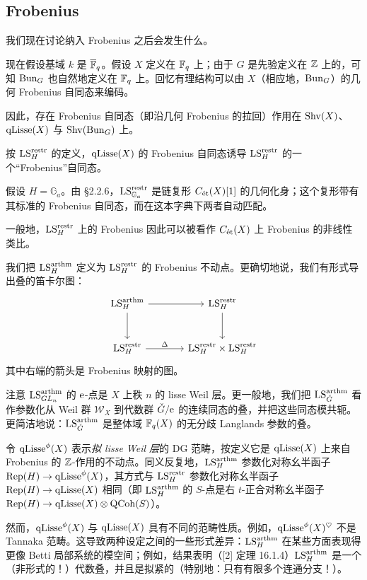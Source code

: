 \subsection{Frobenius}

\pnum{}我们现在讨论纳入 Frobenius 之后会发生什么。

现在假设基域 $k$ 是 $\Fb$。假设 $X$ 定义在 $\F_q$ 上；由于 $G$ 是先验定义在 $\ZZ$ 上的，可知 $\Bun_G$ 也自然地定义在 $\F_q$ 上。回忆有理结构可以由 $X$（相应地，$\Bun_G$）的几何 Frobenius 自同态来编码。

因此，存在 Frobenius 自同态（即沿几何 Frobenius 的拉回）作用在 $\Shv(X)$、$\qLisse(X)$ 与 $\Shv(\Bun_G)$ 上。

按 $\LS^{\restr}_{H}$ 的定义，$\qLisse(X)$ 的 Frobenius 自同态诱导 $\LS^{\restr}_{H}$ 的一个“Frobenius”自同态。

\begin{example}
假设 $H = \mathbb{G}_a$。由 §2.2.6，$\LS^{\restr}_{\mathbb{G}_a}$ 是链复形 $C_{\et}(X)[1]$ 的几何化身；这个复形带有其标准的 Frobenius 自同态，而在这本字典下两者自动匹配。

一般地，$\LS^{\restr}_{H}$ 上的 Frobenius 因此可以被看作 $C_{\et}(X)$ 上 Frobenius 的非线性类比。
\end{example}

\pnum{}我们把 $\LS^{\arthm}_{H}$ 定义为 $\LS^{\restr}_{H}$ 的 Frobenius 不动点。更确切地说，我们有形式导出叠的笛卡尔图：
\begin{equation*}
\begin{tikzcd}[row sep=large, column sep=large]
  \LS^{\arthm}_H \arrow[r] \arrow[d] & \LS^{\restr}_H \arrow[d] \\
  \LS^{\restr}_H \arrow[r, "\Delta"] & \LS^{\restr}_H \times \LS^{\restr}_H
\end{tikzcd}
\end{equation*}
其中右端的箭头是 Frobenius 映射的图。

注意 $\LS^{\arthm}_{GL_n}$ 的 $\e$-点是 $X$ 上秩 $n$ 的 lisse Weil 层。更一般地，我们把 $\LS^{\arthm}_{\bG}$ 看作参数化从 Weil 群 $\mathcal{W}_X$ 到代数群 $\bG/\e$ 的连续同态的叠，并把这些同态模共轭。更简洁地说：$\LS^{\arthm}_{\bG}$ 是整体域 $\F_q(X)$ 的无分歧 Langlands 参数的叠。

\begin{remark}
令 $\qLisse^{\phi}(X)$ 表示\emph{拟 lisse Weil 层}的 DG 范畴，按定义它是 $\qLisse(X)$ 上来自 Frobenius 的 $\ZZ$-作用的不动点。同义反复地，$\LS^{\arthm}_{H}$ 参数化对称幺半函子 $\Rep(H) \to \qLisse^{\phi}(X)$，其方式与 $\LS^{\restr}_{H}$ 参数化对称幺半函子 $\Rep(H) \to \qLisse(X)$ 相同（即 $\LS^{\arthm}_{H}$ 的 $S$-点是右 $t$-正合对称幺半函子 $\Rep(H) \to \qLisse(X) \otimes \QCoh(S)$）。

然而，$\qLisse^{\phi}(X)$ 与 $\qLisse(X)$ 具有不同的范畴性质。例如，$\qLisse^{\phi}(X)^{\heartsuit}$ 不是 Tannaka 范畴。这导致两种设定之间的一些形式差异：$\LS^{\arthm}_{H}$ 在某些方面表现得更像 Betti 局部系统的模空间；例如，结果表明（[2] 定理 16.1.4）$\LS^{\arthm}_{H}$ 是一个（非形式的！）代数叠，并且是拟紧的（特别地：只有有限多个连通分支！）。
\end{remark}

